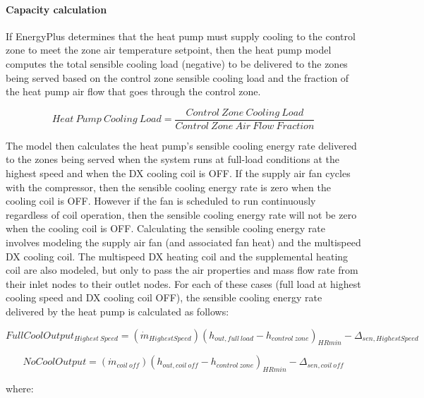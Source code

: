 \paragraph{Capacity calculation}\label{capacity-calculation}

If EnergyPlus determines that the heat pump must supply cooling to the control zone to meet the zone air temperature setpoint, then the heat pump model computes the total sensible cooling load (negative) to be delivered to the zones being served based on the control zone sensible cooling load and the fraction of the heat pump air flow that goes through the control zone.

\begin{equation}
Heat~Pump~Cooling~Load = \frac{{Control~Zone~Cooling~Load}}{{Control~Zone~Air~Flow~Fraction}}
\end{equation}

The model then calculates the heat pump's sensible cooling energy rate delivered to the zones being served when the system runs at full-load conditions at the highest speed and when the DX cooling coil is OFF. If the supply air fan cycles with the compressor, then the sensible cooling energy rate is zero when the cooling coil is OFF. However if the fan is scheduled to run continuously regardless of coil operation, then the sensible cooling energy rate will not be zero when the cooling coil is OFF. Calculating the sensible cooling energy rate involves modeling the supply air fan (and associated fan heat) and the multispeed DX cooling coil. The multispeed DX heating coil and the supplemental heating coil are also modeled, but only to pass the air properties and mass flow rate from their inlet nodes to their outlet nodes. For each of these cases (full load at highest cooling speed and DX cooling coil OFF), the sensible cooling energy rate delivered by the heat pump is calculated as follows:

\begin{equation}
FullCoolOutpu{t_{Highest~Speed}} = \left( {{{\dot m}_{HighestSpeed}}} \right){\left( {{h_{out,full~load}} - {h_{control~zone}}} \right)_{HRmin}} - {\Delta_{sen,HighestSpeed}}
\end{equation}

\begin{equation}
NoCoolOutput = \left( {{{\dot m}_{coil~off}}} \right){\left( {{h_{out,coil~off}} - {h_{control~zone}}} \right)_{HRmin}} - {\Delta_{sen,coil~off}}
\end{equation}

where:


